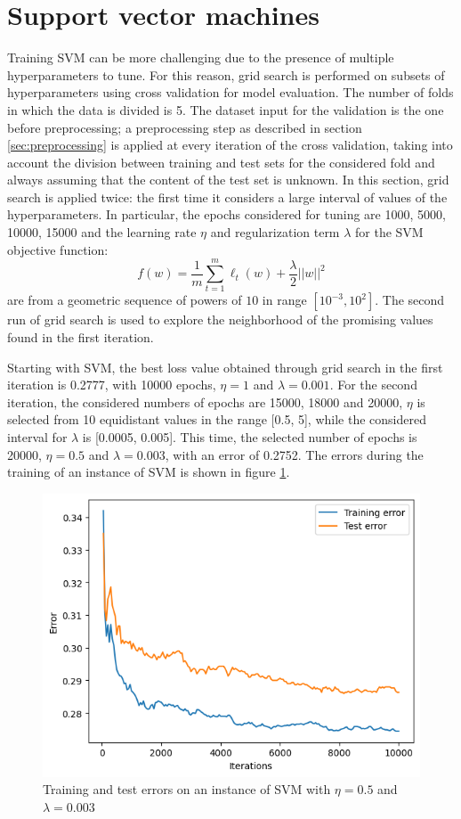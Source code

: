 \documentclass{article}
\begin{document}
\section{Support vector machines}
Training SVM can be more challenging due to the presence of multiple hyperparameters to tune.
For this reason, grid search is performed on subsets of hyperparameters using cross validation for model evaluation. The number of folds in which the data is divided is 5. 
The dataset input for the validation is the one before preprocessing; a preprocessing step as described in section \ref{sec:preprocessing} is applied at every iteration of the cross validation, taking into account the division between training and test sets for the considered fold and always assuming that the content of the test set is unknown. 
In this section, grid search is applied twice: the first time it considers a large interval of values of the hyperparameters. In particular, the epochs considered for tuning are 1000, 5000, 10000, 15000 and the learning rate $\eta$ and regularization term $\lambda$ for the SVM objective function:
\begin{equation}
	f(w) = \frac{1}{m}\sum_{t=1}^m \ell_t(w) + \frac{\lambda}{2}||w||^2
\end{equation}
are from a geometric sequence of powers of $10$ in range $[10^{-3}, 10^2]$. 
The second run of grid search is used to explore the neighborhood of the promising values found in the first iteration.

Starting with SVM, the best loss value obtained through grid search in the first iteration is 0.2777, with 10000 epochs, $\eta=1$ and $\lambda=0.001$. 
For the second iteration, the considered numbers of epochs are 15000, 18000 and 20000, $\eta$ is selected from 10 equidistant values in the range [0.5, 5], while the considered interval for $\lambda$ is [0.0005, 0.005]. 
This time, the selected number of epochs is 20000, $\eta=0.5$ and $\lambda=0.003$, with an error of 0.2752. The errors during the training of an instance of SVM is shown in figure \ref{fig:svm}.
\begin{figure}
	\centering
	\includegraphics[width=0.6\columnwidth]{../plots/svm.png}
	\caption{Training and test errors on an instance of SVM with $\eta=0.5$ and $\lambda=0.003$}
	\label{fig:svm}
\end{figure}
\end{document}
